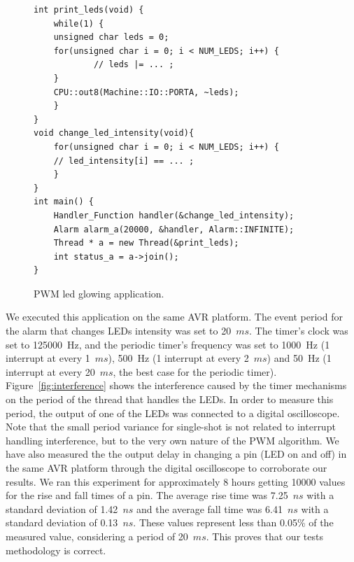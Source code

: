 \documentclass[final,3pd,times]{elsarticle}
\newcommand{\ns}{$ns$}
\newcommand{\ms}{$ms$}
\begin{document}
\begin{figure}[ht]
   \lstset{frame=single,language=C++,xleftmargin=2em,style=prg,basicstyle=\scriptsize}
   \begin{lstlisting}
int print_leds(void) {
    while(1) {
	unsigned char leds = 0;
	for(unsigned char i = 0; i < NUM_LEDS; i++) {
            // leds |= ... ;
	}
	CPU::out8(Machine::IO::PORTA, ~leds);
    }
}
void change_led_intensity(void){
    for(unsigned char i = 0; i < NUM_LEDS; i++) {
	// led_intensity[i] == ... ;
    }
}
int main() {
    Handler_Function handler(&change_led_intensity);
    Alarm alarm_a(20000, &handler, Alarm::INFINITE);
    Thread * a = new Thread(&print_leds);
    int status_a = a->join();
}
   \end{lstlisting}
  \caption{PWM led glowing application.}
  \label{prg:leds}
\end{figure}

We executed this application on the same AVR platform. The event period
for the alarm that changes LEDs intensity was set to 20~\ms{}. The
timer's clock was set to 125000~Hz, and the periodic timer's frequency
was set to 1000~Hz (1 interrupt at every 1~\ms{}), 500~Hz (1 interrupt
at every 2~\ms{}) and 50~Hz (1 interrupt at every 20~\ms{}, the best
case for the periodic timer). Figure~\ref{fig:interference} shows the
interference caused by the timer mechanisms on the period of the thread
that handles the LEDs. In order to measure this period, the output of
one of the LEDs was connected to a digital oscilloscope. Note that the
small period variance for single-shot is not related to interrupt
handling interference, but to the very own nature of the PWM algorithm.
We have also measured the the output delay in changing a pin (LED on and
off) in the same AVR platform through the digital oscilloscope to
corroborate our results.  We ran this experiment for approximately 8
hours getting 10000 values for the rise and fall times of a pin. The
average rise time was 7.25~\ns{} with a standard deviation of 1.42~\ns{}
and the average fall time was 6.41~\ns{} with a standard deviation of
0.13~\ns{}. These values represent less than 0.05\% of the measured
value, considering a period of 20~\ms{}. This proves that our tests
methodology is correct.
\end{document}
